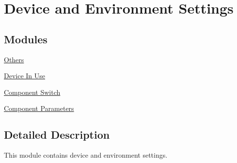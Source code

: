 \hypertarget{group___dev_env_set}{\section{Device and Environment Settings}
\label{group___dev_env_set}
}
\subsection*{Modules}
\begin{DoxyCompactItemize}
\item 
\hyperlink{group___oth}{Others}
\item 
\hyperlink{group___dev_use}{Device In Use}
\item 
\hyperlink{group___cmp_sw}{Component Switch}
\item 
\hyperlink{group___cmp_para}{Component Parameters}
\end{DoxyCompactItemize}


\subsection{Detailed Description}
This module contains device and environment settings. 